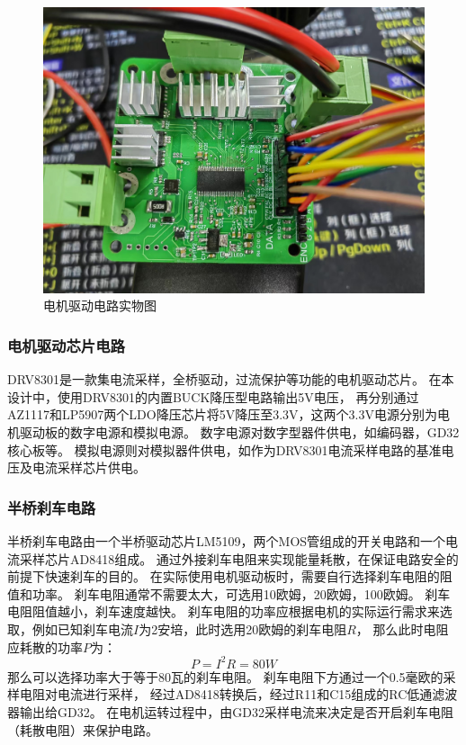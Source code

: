 ﻿\documentclass[12pt,a4paper]{article}
\begin{document}
\begin{figure}[!h]
  \centering
  \includegraphics[width=\textwidth]{./picture/电机驱动板.jpg}
  \caption{电机驱动电路实物图}
  \label{boardx}
\end{figure}


\subsubsection{电机驱动芯片电路}
DRV8301是一款集电流采样，全桥驱动，过流保护等功能的电机驱动芯片。
在本设计中，使用DRV8301的内置BUCK降压型电路输出5V电压，
再分别通过AZ1117和LP5907两个LDO降压芯片将5V降压至3.3V，这两个3.3V电源分别为电机驱动板的数字电源和模拟电源。
数字电源对数字型器件供电，如编码器，GD32核心板等。
模拟电源则对模拟器件供电，如作为DRV8301电流采样电路的基准电压及电流采样芯片供电。

\subsubsection{半桥刹车电路}
半桥刹车电路由一个半桥驱动芯片LM5109，两个MOS管组成的开关电路和一个电流采样芯片AD8418组成。
通过外接刹车电阻来实现能量耗散，在保证电路安全的前提下快速刹车的目的。
在实际使用电机驱动板时，需要自行选择刹车电阻的阻值和功率。
刹车电阻通常不需要太大，可选用10欧姆，20欧姆，100欧姆。
刹车电阻阻值越小，刹车速度越快。
刹车电阻的功率应根据电机的实际运行需求来选取，例如已知刹车电流$I$为2安培，此时选用20欧姆的刹车电阻$R$，
那么此时电阻应耗散的功率$P$为：
\begin{equation}
  \label{board4}
  P = I^2R=80W
\end{equation}
那么可以选择功率大于等于80瓦的刹车电阻。
刹车电阻下方通过一个0.5毫欧的采样电阻对电流进行采样，
经过AD8418转换后，经过R11和C15组成的RC低通滤波器输出给GD32。
在电机运转过程中，由GD32采样电流来决定是否开启刹车电阻（耗散电阻）来保护电路。
\end{document}
